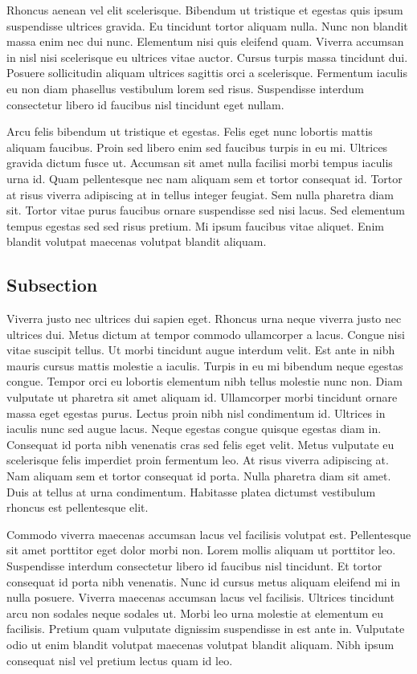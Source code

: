 \documentclass[paper = a4, fontsize = 12pt, numbers = noenddot, DIV = 15, twoside, 
paper = portrait,
listof = totoc,
listof = chapterentry,
egregdoesnotlikesansseriftitles, %
parskip = half %
]{scrbook}
\begin{document}
Rhoncus aenean vel elit scelerisque. Bibendum ut tristique et egestas quis ipsum suspendisse ultrices gravida. Eu tincidunt tortor aliquam nulla. Nunc non blandit massa enim nec dui nunc. Elementum nisi quis eleifend quam. Viverra accumsan in nisl nisi scelerisque eu ultrices vitae auctor. Cursus turpis massa tincidunt dui. Posuere sollicitudin aliquam ultrices sagittis orci a scelerisque. Fermentum iaculis eu non diam phasellus vestibulum lorem sed risus. Suspendisse interdum consectetur libero id faucibus nisl tincidunt eget nullam.

Arcu felis bibendum ut tristique et egestas. Felis eget nunc lobortis mattis aliquam faucibus. Proin sed libero enim sed faucibus turpis in eu mi. Ultrices gravida dictum fusce ut. Accumsan sit amet nulla facilisi morbi tempus iaculis urna id. Quam pellentesque nec nam aliquam sem et tortor consequat id. Tortor at risus viverra adipiscing at in tellus integer feugiat. Sem nulla pharetra diam sit. Tortor vitae purus faucibus ornare suspendisse sed nisi lacus. Sed elementum tempus egestas sed sed risus pretium. Mi ipsum faucibus vitae aliquet. Enim blandit volutpat maecenas volutpat blandit aliquam.

\subsection{Subsection}

Viverra justo nec ultrices dui sapien eget. Rhoncus urna neque viverra justo nec ultrices dui. Metus dictum at tempor commodo ullamcorper a lacus. Congue nisi vitae suscipit tellus. Ut morbi tincidunt augue interdum velit. Est ante in nibh mauris cursus mattis molestie a iaculis. Turpis in eu mi bibendum neque egestas congue. Tempor orci eu lobortis elementum nibh tellus molestie nunc non. Diam vulputate ut pharetra sit amet aliquam id. Ullamcorper morbi tincidunt ornare massa eget egestas purus. Lectus proin nibh nisl condimentum id. Ultrices in iaculis nunc sed augue lacus. Neque egestas congue quisque egestas diam in. Consequat id porta nibh venenatis cras sed felis eget velit. Metus vulputate eu scelerisque felis imperdiet proin fermentum leo. At risus viverra adipiscing at. Nam aliquam sem et tortor consequat id porta. Nulla pharetra diam sit amet. Duis at tellus at urna condimentum. Habitasse platea dictumst vestibulum rhoncus est pellentesque elit.

Commodo viverra maecenas accumsan lacus vel facilisis volutpat est. Pellentesque sit amet porttitor eget dolor morbi non. Lorem mollis aliquam ut porttitor leo. Suspendisse interdum consectetur libero id faucibus nisl tincidunt. Et tortor consequat id porta nibh venenatis. Nunc id cursus metus aliquam eleifend mi in nulla posuere. Viverra maecenas accumsan lacus vel facilisis. Ultrices tincidunt arcu non sodales neque sodales ut. Morbi leo urna molestie at elementum eu facilisis. Pretium quam vulputate dignissim suspendisse in est ante in. Vulputate odio ut enim blandit volutpat maecenas volutpat blandit aliquam. Nibh ipsum consequat nisl vel pretium lectus quam id leo.
\end{document}
